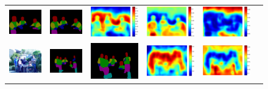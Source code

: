 \documentclass[10pt,twocolumn,letterpaper]{article}
\begin{document}
\begin{figure}
\begin{tabular}{c c c c c c}
   \includegraphics[height=0.1\linewidth]{fig/voc10_part/res_baseline/2010_005626.png} &
   \includegraphics[height=0.1\linewidth]{fig/voc10_part/res_sharenet/2010_005626.png} &
   \includegraphics[height=0.1\linewidth]{fig/voc10_part/att1/2010_005626.pdf} &
   \includegraphics[height=0.1\linewidth]{fig/voc10_part/att2/2010_005626.pdf} &
   \includegraphics[height=0.1\linewidth]{fig/voc10_part/att3/2010_005626.pdf} \\
   \includegraphics[height=0.1\linewidth]{fig/voc10_part/img/2010_005654.jpg} &
   \includegraphics[height=0.1\linewidth]{fig/voc10_part/res_baseline/2010_005654.png} &
   \includegraphics[height=0.1\linewidth]{fig/voc10_part/res_sharenet/2010_005654.png} &
   \includegraphics[height=0.1\linewidth]{fig/voc10_part/att1/2010_005654.pdf} &
   \includegraphics[height=0.1\linewidth]{fig/voc10_part/att2/2010_005654.pdf} &

\end{tabular}
\end{figure}
\end{document}
